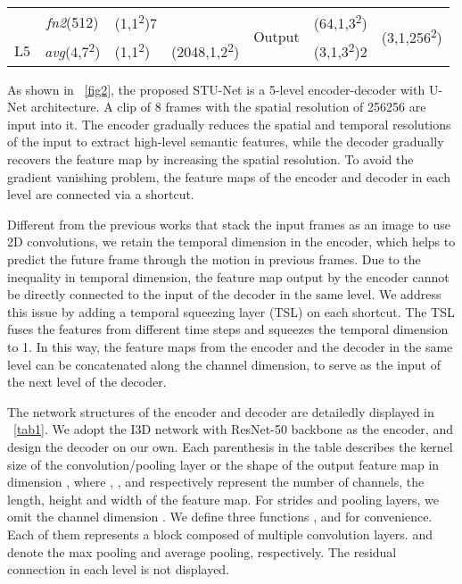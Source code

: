 \documentclass[lettersize,journal]{IEEEtran}
\begin{document}
\begin{table}[!t]
\begin{tabular}{@{}cclcccc@{}}
		& \textit{fn2}(512)      & (1,1\textsuperscript{2})7                   &                               &\multirow{2}{*}{Output}                          & (64,1,3\textsuperscript{2})     & \multirow{2}{*}{(3,1,256\textsuperscript{2})}  \\ \cmidrule(r){1-4}
		L5                  & \textit{avg}(4,7\textsuperscript{2})     & (1,1\textsuperscript{2})                     & (2048,1,2\textsuperscript{2})                   &                          & (3,1,3\textsuperscript{2})2    &                              \\ \bottomrule
	\end{tabular}
\end{table}

As shown in \figurename~\ref{fig2}, the proposed STU-Net is a 5-level encoder-decoder with U-Net architecture.
A clip of 8 frames with the spatial resolution of 256256 are input into it.
The encoder gradually reduces the spatial and temporal resolutions of the input to extract high-level semantic features, while the decoder gradually recovers the feature map by increasing the spatial resolution.
To avoid the gradient vanishing problem, the feature maps of the encoder and decoder in each level are connected via a shortcut.

Different from the previous works that stack the input frames as an image to use 2D convolutions, we retain the temporal dimension in the encoder, which helps to predict the future frame through the motion in previous frames.
Due to the inequality in temporal dimension, the feature map output by the encoder cannot be directly connected to the input of the decoder in the same level.
We address this issue by adding a temporal squeezing layer (TSL) on each shortcut.
The TSL fuses the features from different time steps and squeezes the temporal dimension to 1.
In this way, the feature maps from the encoder and the decoder in the same level can be concatenated along the channel dimension, to serve as the input of the next level of the decoder.


The network structures of the encoder and decoder are detailedly displayed in \tablename~\ref{tab1}.
We adopt the I3D network \cite{QuoVadis2017carreira} with ResNet-50 backbone \cite{DeepResidual2016he} as the encoder, and design the decoder on our own.
Each parenthesis in the table describes the kernel size of the convolution/pooling layer or the shape of the output feature map in dimension , where , ,  and  respectively represent the number of channels, the length, height and width of the feature map.
For strides and pooling layers, we omit the channel dimension .
We define three functions ,  and  for convenience. Each of them represents a block composed of multiple convolution layers.
 and  denote the max pooling and average pooling, respectively.
The residual connection in each level is not displayed.
\end{document}
